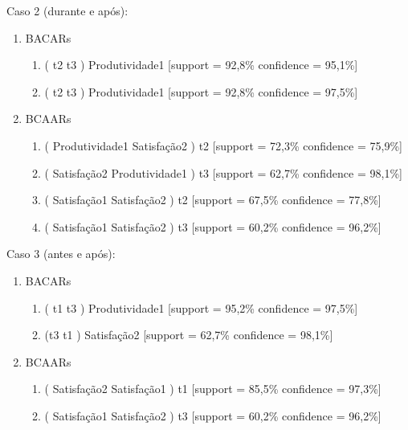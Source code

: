 \documentclass[kdmile,a4paper]{kdmile} %
\begin{document}
Caso 2 (durante e após):
\begin{enumerate}
   \item BACARs
   \begin{enumerate}
     \footnotesize \item ( t2 \textrightarrow{} t3 ) Produtividade1 [support = 92,8\% confidence = 95,1\%]
     \item ( t2 \textrightarrow{} t3 ) Produtividade1 [support = 92,8\% confidence = 97,5\%]
   \end{enumerate}
   \item BCAARs
   \begin{enumerate}
       \footnotesize \item ( Produtividade1 \textrightarrow{} Satisfação2 ) t2 [support = 72,3\% confidence = 75,9\%]
       \item ( Satisfação2\textrightarrow{} Produtividade1 ) t3 [support = 62,7\% confidence = 98,1\%]
       \item ( Satisfação1 \textrightarrow{} Satisfação2 ) t2 [support = 67,5\% confidence = 77,8\%]
       \item ( Satisfação1 \textrightarrow{} Satisfação2 ) t3 [support = 60,2\% confidence = 96,2\%]
   \end{enumerate}
 \end{enumerate}

 Caso 3 (antes e após):
\begin{enumerate}
   \item BACARs
   \begin{enumerate}
     \footnotesize \item ( t1 \textrightarrow{} t3 ) Produtividade1 [support = 95,2\% confidence = 97,5\%]
     \item (t3 \textrightarrow{} t1 ) Satisfação2 [support = 62,7\% confidence = 98,1\%]
   \end{enumerate}
   \item BCAARs
   \begin{enumerate}
       \footnotesize \item ( Satisfação2 \textrightarrow{} Satisfação1 ) t1 [support = 85,5\% confidence = 97,3\%]
       \item ( Satisfação1 \textrightarrow{} Satisfação2 ) t3 [support = 60,2\% confidence = 96,2\%]
   \end{enumerate}
 \end{enumerate}
 
\end{document}
